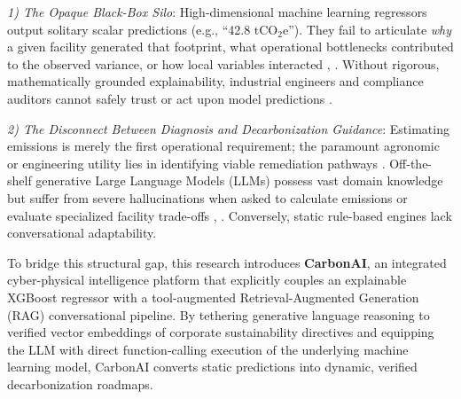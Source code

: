 \documentclass[conference]{IEEEtran}
\begin{document}
\textit{1) The Opaque Black-Box Silo}: High-dimensional machine learning regressors output solitary scalar predictions (e.g., ``42.8 $\text{tCO}_2\text{e}$''). They fail to articulate \textit{why} a given facility generated that footprint, what operational bottlenecks contributed to the observed variance, or how local variables interacted \cite{ribeiro2016lime}, \cite{molnar2022interpretable}. Without rigorous, mathematically grounded explainability, industrial engineers and compliance auditors cannot safely trust or act upon model predictions \cite{osei2023trust}.

\textit{2) The Disconnect Between Diagnosis and Decarbonization Guidance}: Estimating emissions is merely the first operational requirement; the paramount agronomic or engineering utility lies in identifying viable remediation pathways \cite{savary2022digital}. Off-the-shelf generative Large Language Models (LLMs) possess vast domain knowledge but suffer from severe hallucinations when asked to calculate emissions or evaluate specialized facility trade-offs \cite{lewis2020rag}, \cite{gao2023ragreview}. Conversely, static rule-based engines lack conversational adaptability.

To bridge this structural gap, this research introduces \textbf{CarbonAI}, an integrated cyber-physical intelligence platform that explicitly couples an explainable XGBoost regressor with a tool-augmented Retrieval-Augmented Generation (RAG) conversational pipeline. By tethering generative language reasoning to verified vector embeddings of corporate sustainability directives and equipping the LLM with direct function-calling execution of the underlying machine learning model, CarbonAI converts static predictions into dynamic, verified decarbonization roadmaps.
\end{document}
